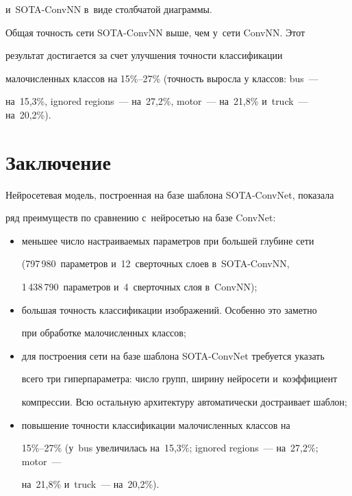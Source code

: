 и~SOTA-\mbox{ConvNN} в~виде столб\-ча\-той диа\-граммы.


  


  


 


  


  Общая точность сети SOTA-\mbox{ConvNN} выше, чем у~сети \mbox{ConvNN}. Этот 


результат достигается за счет улучшения точности классификации 


малочисленных классов на 15\%--27\% (точность выросла у классов: bus~--- 


на~15,3\%, ignored regions~--- на~27,2\%, motor~--- на~21,8\% и~truck~--- на~20,2\%).





\section{Заключение}





  Нейросетевая модель, построенная на базе шаблона SOTA-ConvNet, показала 


ряд преимуществ по сравнению с~нейросетью на базе ConvNet:


  \begin{itemize}


  \item  меньшее число настраиваемых параметров при большей глубине сети 


(797\,980~параметров и~12~сверточных слоев в~SOTA-ConvNN, 


1\,438\,790~параметров и~4~сверточных слоя в~ConvNN);


  \item большая точность классификации изображений. Особенно это заметно 


при обработке малочисленных классов;


  \item для построения сети на базе шаблона SOTA-ConvNet требуется указать 


всего три гиперпараметра: число групп, ширину нейросети и~коэффициент 


компрессии. Всю остальную архитектуру автоматически достраивает шаблон;


  \item повышение точности классификации малочисленных классов на  


15\%--27\% (у~bus увеличилась на~15,3\%; ignored regions~--- на~27,2\%; motor~--- 


на~21,8\% и~truck~--- на~20,2\%).


  \end{itemize}



